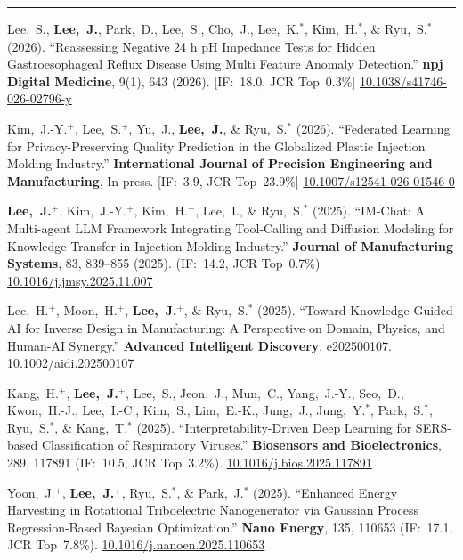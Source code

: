 \documentclass[11pt, a4paper]{article}
\newenvironment{cvsec}[1]{%
  \par\vspace{0.9em}%
  \noindent{\large\bfseries #1}\par\nobreak%
  \vspace{2pt}%
  \noindent\rule{\linewidth}{0.4pt}\par\nobreak%
  \vspace{3pt}%
  \noindent%
}{%
  \vspace{2pt}%
}
\newenvironment{pubrev}[1]{%
  \begin{etaremune}[leftmargin=2em, itemsep=5pt, parsep=0pt, topsep=0pt, partopsep=0pt, start=#1]%
}{%
  \end{etaremune}%
}
\begin{document}
\begin{cvsec}{Publications}
\begin{pubrev}{18}
\item Lee,~S., \textbf{Lee,~J.}, Park,~D., Lee,~S., Cho,~J., Lee,~K.$^*$, Kim,~H.$^*$, \& Ryu,~S.$^*$ (2026).
``Reassessing Negative 24 h pH Impedance Tests for Hidden Gastroesophageal Reflux Disease Using Multi Feature Anomaly Detection.''
\textbf{npj Digital Medicine}, 9(1), 643 (2026). [IF:~18.0, JCR Top~0.3\%]
\href{https://doi.org/10.1038/s41746-026-02796-y}{10.1038/s41746-026-02796-y}

\item Kim,~J.-Y.$^+$, Lee,~S.$^+$, Yu,~J., \textbf{Lee,~J.}, \& Ryu,~S.$^*$ (2026).
``Federated Learning for Privacy-Preserving Quality Prediction in the Globalized Plastic Injection Molding Industry.''
\textbf{International Journal of Precision Engineering and Manufacturing}, In press. [IF:~3.9, JCR Top~23.9\%]
\href{https://doi.org/10.1007/s12541-026-01546-0}{10.1007/s12541-026-01546-0}

\item \textbf{Lee,~J.}$^+$, Kim,~J.-Y.$^+$, Kim,~H.$^+$, Lee,~I., \& Ryu,~S.$^*$ (2025).
``IM-Chat: A Multi-agent LLM Framework Integrating Tool-Calling and Diffusion Modeling for Knowledge Transfer in Injection Molding Industry.''
\textbf{Journal of Manufacturing Systems}, 83, 839--855 (2025). (IF:~14.2, JCR Top~0.7\%)
\href{https://doi.org/10.1016/j.jmsy.2025.11.007}{10.1016/j.jmsy.2025.11.007}

\item Lee,~H.$^+$, Moon,~H.$^+$, \textbf{Lee,~J.}$^+$, \& Ryu,~S.$^*$ (2025).
``Toward Knowledge-Guided AI for Inverse Design in Manufacturing: A Perspective on Domain, Physics, and Human-AI Synergy.''
\textbf{Advanced Intelligent Discovery}, e202500107.
\href{https://doi.org/10.1002/aidi.202500107}{10.1002/aidi.202500107}

\item Kang,~H.$^+$, \textbf{Lee,~J.}$^+$, Lee,~S., Jeon,~J., Mun,~C., Yang,~J.-Y., Seo,~D., Kwon,~H.-J., Lee,~I.-C., Kim,~S., Lim,~E.-K., Jung,~J., Jung,~Y.$^*$, Park,~S.$^*$, Ryu,~S.$^*$, \& Kang,~T.$^*$ (2025).
``Interpretability-Driven Deep Learning for SERS-based Classification of Respiratory Viruses.''
\textbf{Biosensors and Bioelectronics}, 289, 117891 (IF:~10.5, JCR Top~3.2\%).
\href{https://doi.org/10.1016/j.bios.2025.117891}{10.1016/j.bios.2025.117891}

\item Yoon,~J.$^+$, \textbf{Lee,~J.}$^+$, Ryu,~S.$^*$, \& Park,~J.$^*$ (2025).
``Enhanced Energy Harvesting in Rotational Triboelectric Nanogenerator via Gaussian Process Regression-Based Bayesian Optimization.''
\textbf{Nano Energy}, 135, 110653 (IF:~17.1, JCR Top~7.8\%).
\href{https://doi.org/10.1016/j.nanoen.2025.110653}{10.1016/j.nanoen.2025.110653}


\end{pubrev}
\end{cvsec}
\end{document}
